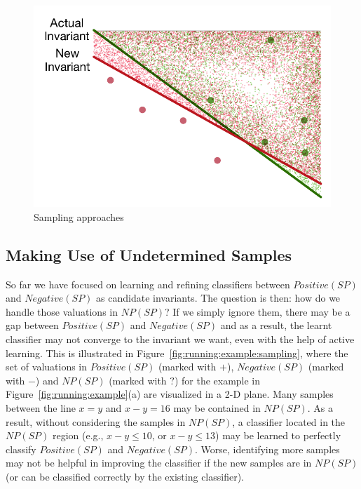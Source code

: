 \begin{figure}[t]
        \centering
        \includegraphics[scale=0.3]{figures/general-sampling-3.pdf}
    \caption{Sampling approaches}
    \label{fig:sampling}
\end{figure}

\subsection{Making Use of Undetermined Samples} \label{alternative}
So far we have focused on learning and refining classifiers between $Positive(SP)$ and $Negative(SP)$ as candidate invariants. The question is then: how do we handle those valuations in $NP(SP)$? If we simply ignore them, there may be a gap between $Positive(SP)$ and $Negative(SP)$ and as a result, the learnt classifier may not converge to the invariant we want, even with the help of active learning.
This is illustrated in Figure~\ref{fig:running:example:sampling}, where the set of valuations in $Positive(SP)$ (marked with $+$), $Negative(SP)$ (marked with $-$) and $NP(SP)$ (marked with $?$) for the example in Figure~\ref{fig:running:example}(a) are visualized in a 2-D plane. Many samples between the line $x=y$ and $x-y=16$ may be contained in $NP(SP)$. As a result, without considering the samples in $NP(SP)$, a classifier located in the $NP(SP)$ region (e.g., $x - y \leq 10$, or $x - y \leq 13$) may be learned to perfectly classify $Positive(SP)$ and $Negative(SP)$. Worse, identifying more samples may not be helpful in improving the classifier if the new samples are in $NP(SP)$ (or can be classified correctly by the existing classifier).

